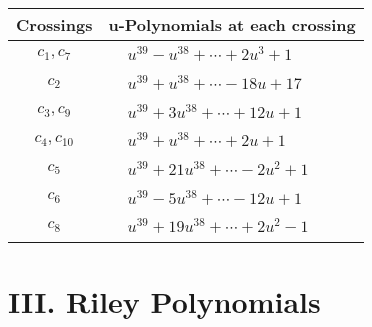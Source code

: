 \documentclass[1p]{elsarticle_modified}
\theoremstyle{definition}
\begin{document}
\begin{tabular}{m{50pt}|m{274pt}}
Crossings & \hspace{64pt}u-Polynomials at each crossing \\
\hline $$\begin{aligned}c_{1},c_{7}\end{aligned}$$&$\begin{aligned}
&u^{39}- u^{38}+\cdots+2 u^3+1
\end{aligned}$\\
\hline $$\begin{aligned}c_{2}\end{aligned}$$&$\begin{aligned}
&u^{39}+u^{38}+\cdots-18 u+17
\end{aligned}$\\
\hline $$\begin{aligned}c_{3},c_{9}\end{aligned}$$&$\begin{aligned}
&u^{39}+3 u^{38}+\cdots+12 u+1
\end{aligned}$\\
\hline $$\begin{aligned}c_{4},c_{10}\end{aligned}$$&$\begin{aligned}
&u^{39}+u^{38}+\cdots+2 u+1
\end{aligned}$\\
\hline $$\begin{aligned}c_{5}\end{aligned}$$&$\begin{aligned}
&u^{39}+21 u^{38}+\cdots-2 u^2+1
\end{aligned}$\\
\hline $$\begin{aligned}c_{6}\end{aligned}$$&$\begin{aligned}
&u^{39}-5 u^{38}+\cdots-12 u+1
\end{aligned}$\\
\hline $$\begin{aligned}c_{8}\end{aligned}$$&$\begin{aligned}
&u^{39}+19 u^{38}+\cdots+2 u^2-1
\end{aligned}$\\
\hline
\end{tabular}\newpage\renewcommand{\arraystretch}{1}
\centering \section*{ III. Riley Polynomials}
\end{document}
